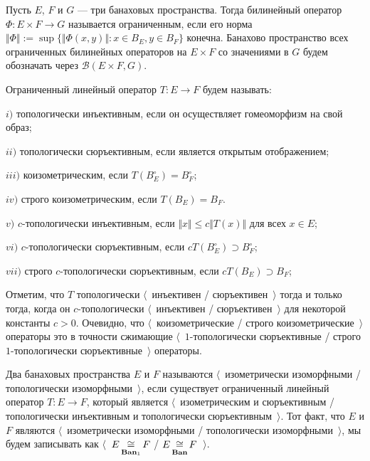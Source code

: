 Пусть $E$, $F$ и $G$ --- три банаховых пространства. Тогда билинейный оператор $\Phi:E\times F\to G$ называется ограниченным, если его норма $\Vert \Phi\Vert:=\sup\{\Vert \Phi(x,y)\Vert:x\in B_E, y\in B_F\}$ конечна. Банахово пространство всех ограниченных билинейных операторов на $E\times F$ со значениями в $G$ будем обозначать через $\mathcal{B}(E\times F,G)$.

Ограниченный линейный оператор $T:E\to F$ будем называть:

$i)$ топологически инъективным, если он осуществляет гомеоморфизм на свой образ;

$ii)$ топологически сюръективным, если является открытым отображением;

$iii)$ коизометрическим, если $T(B_E^\circ)=B_F^\circ$;

$iv)$ строго коизометрическим, если $T(B_E)=B_F$. 

$v)$ $c$-топологически инъективным, если $\Vert x\Vert\leq c\Vert  T(x)\Vert$ для всех $x\in E$;

$vi)$ $c$-топологически сюръективным, если $cT(B_E^\circ)\supset B_F^\circ$;

$vii)$ строго $c$-топологически сюръективным, если $cT(B_E)\supset B_F$; 

Отметим, что $T$ топологически $\langle$~инъективен / сюръективен~$\rangle$ тогда и только тогда, когда он $c$-топологически $\langle$~инъективен / сюръективен~$\rangle$ для некоторой константы $c>0$. Очевидно, что $\langle$~коизометрические / строго коизометрические~$\rangle$ операторы это в точности сжимающие $\langle$~$1$-топологически сюръективные / строго $1$-топологически сюръективные~$\rangle$ операторы.

Два банаховых пространства $E$ и $F$ называются $\langle$~изометрически изоморфными / топологически изоморфными~$\rangle$, если существует ограниченный линейный оператор $T:E\to F$, который является $\langle$~изометрическим и сюръективным / топологически инъективным и топологически сюръективным~$\rangle$. Тот факт, что $E$ и $F$ являются $\langle$~изометрически изоморфными / топологически изоморфными~$\rangle$, мы будем записывать как $\langle$~$E\mathop{\mathbin{\cong}}\limits_{\mathbf{Ban}_1}F$ / $E\mathop{\mathbin{\cong}}\limits_{\mathbf{Ban}}F$~$\rangle$.

